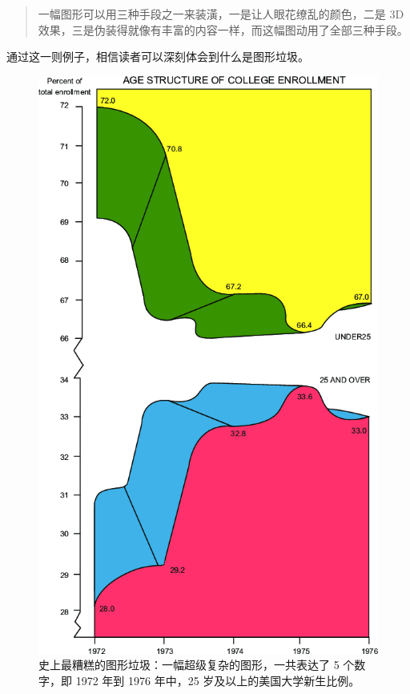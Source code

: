 \documentclass[
  b5paper,
  UTF8,twoside]{book}
\begin{document}
\begin{quote}
一幅图形可以用三种手段之一来装潢，一是让人眼花缭乱的颜色，二是 3D 效果，三是伪装得就像有丰富的内容一样，而这幅图动用了全部三种手段。
\end{quote}

通过这一则例子，相信读者可以深刻体会到什么是图形垃圾。

\begin{figure}

{\centering \includegraphics{images/worst-graph} 

}

\caption[史上最糟糕的图形垃圾]{史上最糟糕的图形垃圾：一幅超级复杂的图形，一共表达了 5 个数字，即 1972 年到 1976 年中，25 岁及以上的美国大学新生比例。}\label{fig:worst-graph}
\end{figure}
\end{document}
